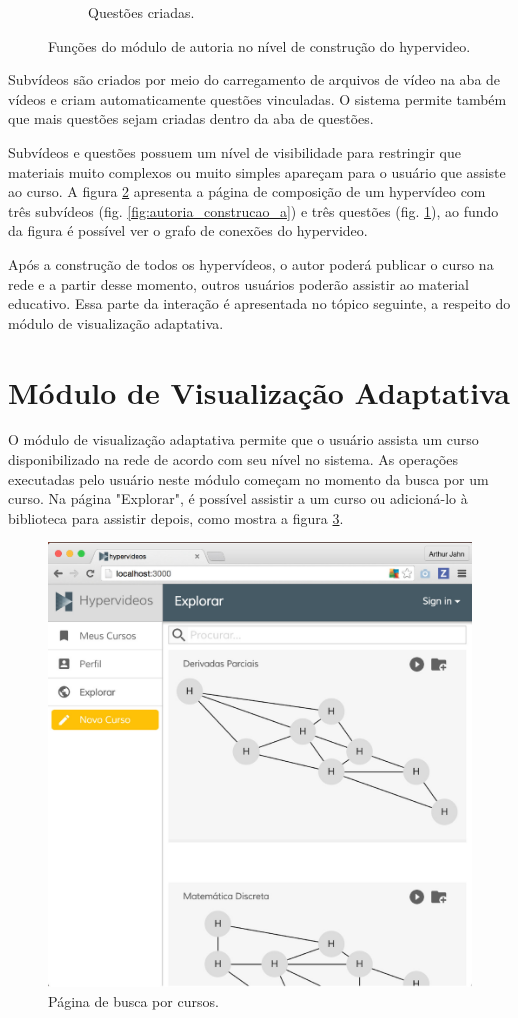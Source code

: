 \begin{figure}[h!]
\begin{subfigure}{.5\textwidth}
  		\caption{Questões criadas.}
  		\label{fig:autoria_construcao_b}
	\end{subfigure}%
  	\caption{Funções do módulo de autoria no nível de construção do hypervideo.}
  	\label{fig:autoria_construcao}
\end{figure}

Subvídeos são criados por meio do carregamento de arquivos de vídeo na aba de vídeos e criam automaticamente questões vinculadas. O sistema permite também que mais questões sejam criadas dentro da aba de questões. 

Subvídeos e questões possuem um nível de visibilidade para restringir que materiais muito complexos ou muito simples apareçam para o usuário que assiste ao curso. A figura \ref{fig:autoria_construcao} apresenta a página de composição de um hypervídeo com três subvídeos (fig. \ref{fig:autoria_construcao_a}) e três questões (fig. \ref{fig:autoria_construcao_b}), ao fundo da figura é possível ver o grafo de conexões do hypervideo.

Após a construção de todos os hypervídeos, o autor poderá publicar o curso na rede e a partir desse momento, outros usuários poderão assistir ao material educativo. Essa parte da interação é apresentada no tópico seguinte, a respeito do módulo de visualização adaptativa.

\section{Módulo de Visualização Adaptativa}

O módulo de visualização adaptativa permite que o usuário assista um curso disponibilizado na rede de acordo com seu nível no sistema. As operações executadas pelo usuário neste módulo começam no momento da busca por um curso. Na página "Explorar", é possível assistir a um curso ou adicioná-lo à biblioteca para assistir depois, como mostra a figura \ref{fig:explorar}.

\begin{figure}[h!]
  	\centering
  	\includegraphics[width=.6\linewidth]{figuras/explorar.eps}
  	\caption{Página de busca por cursos.}
  	\label{fig:explorar}
\end{figure}

